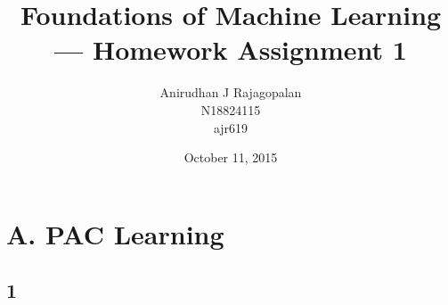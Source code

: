 \documentclass{article}
\begin{document}
\title{Foundations of Machine Learning --- Homework Assignment 1}
\date{October 11, 2015}
\author{Anirudhan J Rajagopalan\\ N18824115\\ ajr619}

\maketitle

\newpage

\section*{A. PAC Learning}
\subsection*{1}
\end{document}

